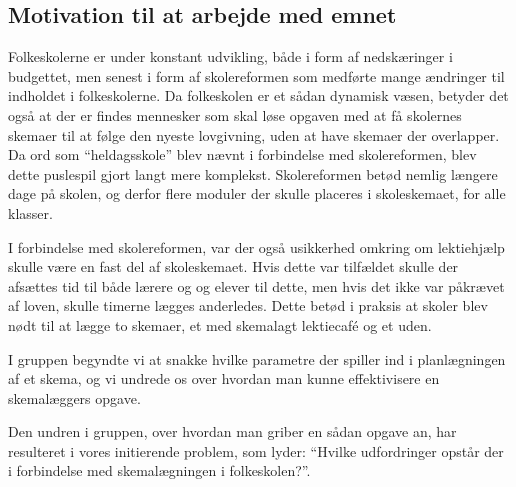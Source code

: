 \subsection{Motivation til at arbejde med emnet}
Folkeskolerne er under konstant udvikling, både i form af nedskæringer i budgettet, men senest i form af skolereformen som medførte mange ændringer til indholdet i folkeskolerne. Da folkeskolen er et sådan dynamisk væsen, betyder det også at der er findes mennesker som skal løse opgaven med at få skolernes skemaer til at følge den nyeste lovgivning, uden at have skemaer der overlapper. Da ord som ``heldagsskole'' blev nævnt i forbindelse med skolereformen, blev dette puslespil gjort langt mere komplekst. Skolereformen betød nemlig længere dage på skolen, og derfor flere moduler der skulle placeres i skoleskemaet, for alle klasser.

I forbindelse med skolereformen, var der også usikkerhed omkring om lektiehjælp skulle være en fast del af skoleskemaet. Hvis dette var tilfældet skulle der afsættes tid til både lærere og og elever til dette, men hvis det ikke var påkrævet af loven, skulle timerne lægges anderledes. Dette betød i praksis at skoler blev nødt til at lægge to skemaer, et med skemalagt lektiecaf\'e og et uden. 

I gruppen begyndte vi at snakke hvilke parametre der spiller ind i planlægningen af et skema, og vi undrede os over hvordan man kunne effektivisere en skemalæggers opgave.

Den undren i gruppen, over hvordan man griber en sådan opgave an, har resulteret i vores initierende problem, som lyder: ``Hvilke udfordringer opstår der i forbindelse med skemalægningen i folkeskolen?''.

